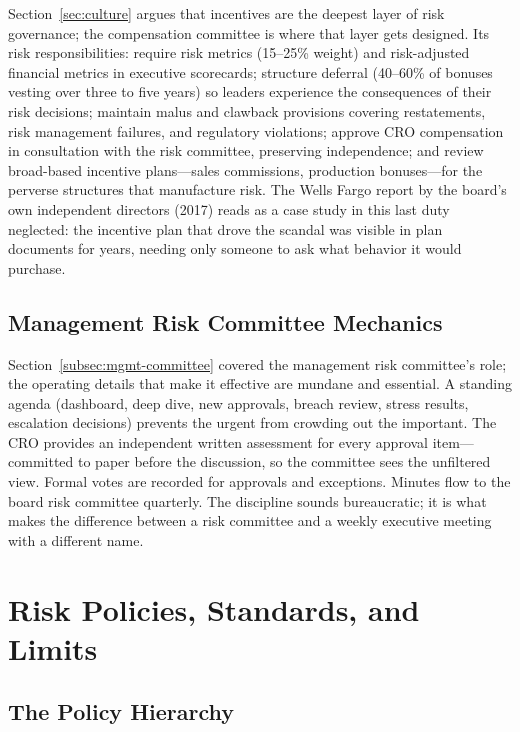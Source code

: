 \documentclass[11pt,openany]{book}
\begin{document}
Section~\ref{sec:culture} argues that incentives are the deepest layer of
risk governance; the compensation committee is where that layer gets
designed. Its risk responsibilities: require risk metrics (15--25\% weight)
and risk-adjusted financial metrics in executive scorecards; structure
deferral (40--60\% of bonuses vesting over three to five years) so leaders
experience the consequences of their risk decisions; maintain malus and
clawback provisions covering restatements, risk management failures, and
regulatory violations; approve CRO compensation in consultation with the risk
committee, preserving independence; and review broad-based incentive
plans---sales commissions, production bonuses---for the perverse structures
that manufacture risk. The Wells Fargo report by the board's own independent
directors (2017) reads as a case study in this last duty neglected: the
incentive plan that drove the scandal was visible in plan documents for
years, needing only someone to ask what behavior it would purchase.

\subsection{Management Risk Committee Mechanics}

Section~\ref{subsec:mgmt-committee} covered the management risk committee's
role; the operating details that make it effective are mundane and essential.
A standing agenda (dashboard, deep dive, new approvals, breach review, stress
results, escalation decisions) prevents the urgent from crowding out the
important. The CRO provides an independent written assessment for every
approval item---committed to paper before the discussion, so the committee
sees the unfiltered view. Formal votes are recorded for approvals and
exceptions. Minutes flow to the board risk committee quarterly. The
discipline sounds bureaucratic; it is what makes the difference between a
risk committee and a weekly executive meeting with a different name.

\section{Risk Policies, Standards, and Limits}
\label{sec:policies}

\subsection{The Policy Hierarchy}
\end{document}
